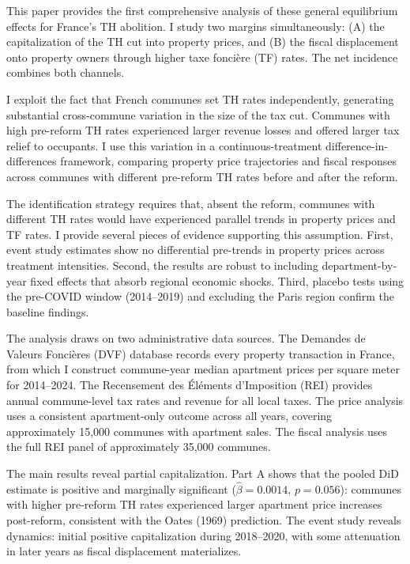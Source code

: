 \documentclass[12pt]{article}
\begin{document}
This paper provides the first comprehensive analysis of these general equilibrium effects for France's TH abolition. I study two margins simultaneously: (A) the capitalization of the TH cut into property prices, and (B) the fiscal displacement onto property owners through higher taxe fonci\`ere (TF) rates. The net incidence combines both channels.

I exploit the fact that French communes set TH rates independently, generating substantial cross-commune variation in the size of the tax cut. Communes with high pre-reform TH rates experienced larger revenue losses and offered larger tax relief to occupants. I use this variation in a continuous-treatment difference-in-differences framework, comparing property price trajectories and fiscal responses across communes with different pre-reform TH rates before and after the reform.

The identification strategy requires that, absent the reform, communes with different TH rates would have experienced parallel trends in property prices and TF rates. I provide several pieces of evidence supporting this assumption. First, event study estimates show no differential pre-trends in property prices across treatment intensities. Second, the results are robust to including department-by-year fixed effects that absorb regional economic shocks. Third, placebo tests using the pre-COVID window (2014--2019) and excluding the Paris region confirm the baseline findings.

The analysis draws on two administrative data sources. The Demandes de Valeurs Fonci\`eres (DVF) database records every property transaction in France, from which I construct commune-year median apartment prices per square meter for 2014--2024. The Recensement des \'El\'ements d'Imposition (REI) provides annual commune-level tax rates and revenue for all local taxes. The price analysis uses a consistent apartment-only outcome across all years, covering approximately 15,000 communes with apartment sales. The fiscal analysis uses the full REI panel of approximately 35,000 communes.

The main results reveal partial capitalization. Part A shows that the pooled DiD estimate is positive and marginally significant ($\hat\beta = 0.0014$, $p = 0.056$): communes with higher pre-reform TH rates experienced larger apartment price increases post-reform, consistent with the Oates (1969) prediction. The event study reveals dynamics: initial positive capitalization during 2018--2020, with some attenuation in later years as fiscal displacement materializes.
\end{document}
